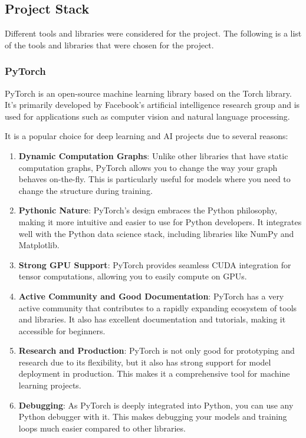 \subsection{Project Stack}
Different tools and libraries were considered for the project. The following is a list of the tools and libraries that were chosen for the project.

\subsubsection{PyTorch}
PyTorch is an open-source machine learning library based on the Torch library. It's primarily developed by Facebook's artificial intelligence research group and is used for applications such as computer vision and natural language processing.

It is a popular choice for deep learning and AI projects due to several reasons:
\begin{enumerate}
    \item \textbf{Dynamic Computation Graphs}: Unlike other libraries that have static computation graphs, PyTorch allows you to change the way your graph behaves on-the-fly. This is particularly useful for models where you need to change the structure during training.
    \item \textbf{Pythonic Nature}: PyTorch's design embraces the Python philosophy, making it more intuitive and easier to use for Python developers. It integrates well with the Python data science stack, including libraries like NumPy and Matplotlib.
    \item \textbf{Strong GPU Support}: PyTorch provides seamless CUDA integration for tensor computations, allowing you to easily compute on GPUs.
    \item \textbf{Active Community and Good Documentation}: PyTorch has a very active community that contributes to a rapidly expanding ecosystem of tools and libraries. It also has excellent documentation and tutorials, making it accessible for beginners.
    \item \textbf{Research and Production}: PyTorch is not only good for prototyping and research due to its flexibility, but it also has strong support for model deployment in production. This makes it a comprehensive tool for machine learning projects.
    \item \textbf{Debugging}: As PyTorch is deeply integrated into Python, you can use any Python debugger with it. This makes debugging your models and training loops much easier compared to other libraries.
\end{enumerate}

